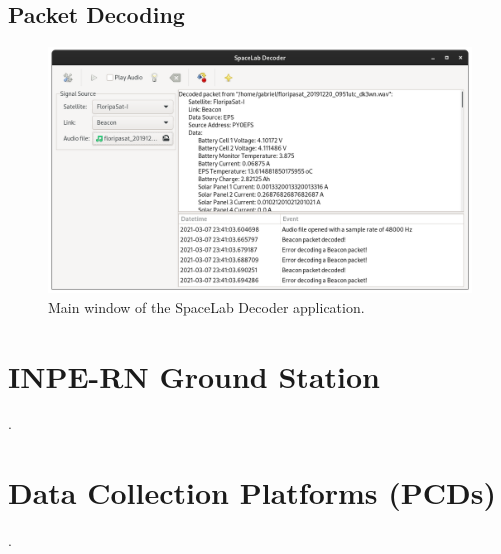 \subsection{Packet Decoding}

\cite{spacelab-decoder}

\begin{figure}[!ht]
    \begin{center}
        \includegraphics[width=\textwidth]{figures/spacelab-decoder.png}
        \caption{Main window of the SpaceLab Decoder application.}
        \label{fig:spacelab-decoder}
    \end{center}
\end{figure}

\section{INPE-RN Ground Station}

.

\section{Data Collection Platforms (PCDs)}

.
